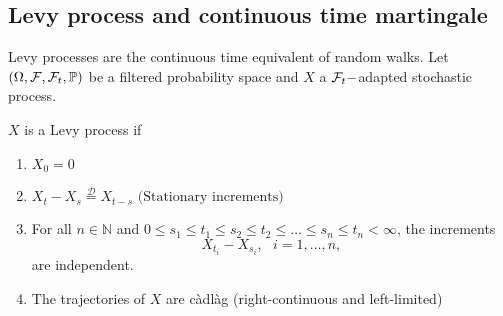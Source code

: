 \subsection{Levy process and continuous time martingale}\label{ssec:levy_mart}
Levy processes are the continuous time equivalent of random walks. Let $(\Omega,\mathcal{F},\mathcal{F}_t,\mathbb{P})$ be a filtered probability space and $X$ a $\mathcal{F}_t-$adapted stochastic process.
\begin{definition}
$X$ is a Levy process if
\begin{enumerate}
    \item $X_0 = 0$
    \item $X_t - X_s \overset{\mathcal{D}}{=}X_{t-s}\text{ (Stationary increments)}$
    \item For all $n\in\mathbb{N}$ and $0\leq s_1\leq t_1\leq s_2\leq t_2\leq \ldots\leq s_n\leq t_n<\infty$, the increments
    $$
    X_{t_i}-X_{s_i},\text{ }i = 1,\ldots, n,
    $$
    are independent.
    \item The trajectories of $X$ are càdlàg (right-continuous and left-limited)
\end{enumerate}
\end{definition}


